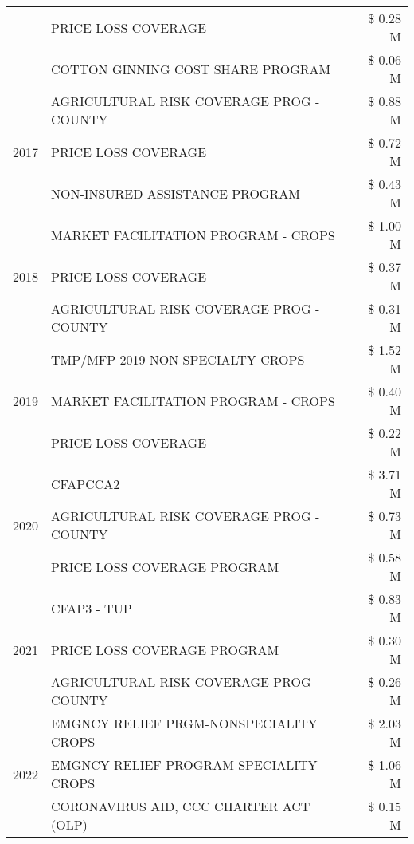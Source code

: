 \begin{tabular}{llr}
 & PRICE LOSS COVERAGE & \$ 0.28 M \\
 & COTTON GINNING COST SHARE PROGRAM & \$ 0.06 M \\
\cline{1-3}
\multirow[t]{3}{*}{2017} & AGRICULTURAL RISK COVERAGE PROG - COUNTY & \$ 0.88 M \\
 & PRICE LOSS COVERAGE & \$ 0.72 M \\
 & NON-INSURED ASSISTANCE PROGRAM & \$ 0.43 M \\
\cline{1-3}
\multirow[t]{3}{*}{2018} & MARKET FACILITATION PROGRAM - CROPS & \$ 1.00 M \\
 & PRICE LOSS COVERAGE & \$ 0.37 M \\
 & AGRICULTURAL RISK COVERAGE PROG - COUNTY & \$ 0.31 M \\
\cline{1-3}
\multirow[t]{3}{*}{2019} & TMP/MFP 2019 NON SPECIALTY CROPS & \$ 1.52 M \\
 & MARKET FACILITATION PROGRAM - CROPS & \$ 0.40 M \\
 & PRICE LOSS COVERAGE & \$ 0.22 M \\
\cline{1-3}
\multirow[t]{3}{*}{2020} & CFAPCCA2 & \$ 3.71 M \\
 & AGRICULTURAL RISK COVERAGE PROG - COUNTY & \$ 0.73 M \\
 & PRICE LOSS COVERAGE PROGRAM & \$ 0.58 M \\
\cline{1-3}
\multirow[t]{3}{*}{2021} & CFAP3 - TUP & \$ 0.83 M \\
 & PRICE LOSS COVERAGE PROGRAM & \$ 0.30 M \\
 & AGRICULTURAL RISK COVERAGE PROG - COUNTY & \$ 0.26 M \\
\cline{1-3}
\multirow[t]{3}{*}{2022} & EMGNCY RELIEF PRGM-NONSPECIALITY CROPS & \$ 2.03 M \\
 & EMGNCY RELIEF PROGRAM-SPECIALITY CROPS & \$ 1.06 M \\
 & CORONAVIRUS AID, CCC CHARTER ACT (OLP) & \$ 0.15 M \\
\cline{1-3}
\bottomrule
\end{tabular}
